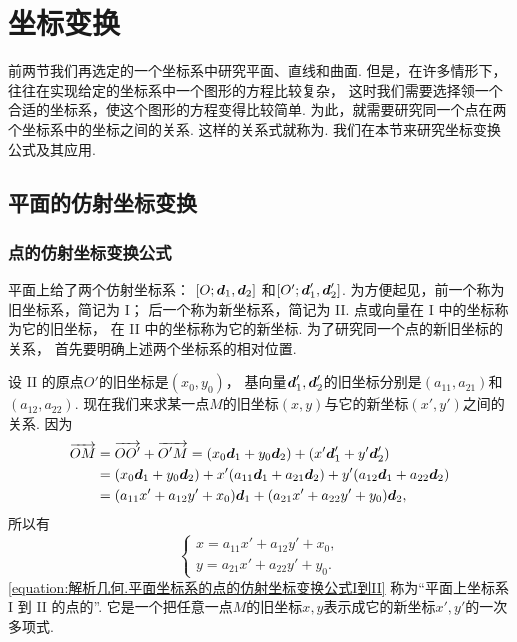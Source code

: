\section{坐标变换}
前两节我们再选定的一个坐标系中研究平面、直线和曲面.
但是，在许多情形下，往往在实现给定的坐标系中一个图形的方程比较复杂，
这时我们需要选择领一个合适的坐标系，使这个图形的方程变得比较简单.
为此，就需要研究同一个点在两个坐标系中的坐标之间的关系.
这样的关系式就称为.
我们在本节来研究坐标变换公式及其应用.

\subsection{平面的仿射坐标变换}
\subsubsection{点的仿射坐标变换公式}
平面上给了两个仿射坐标系：
\([O;\boldsymbol{d}_1,\boldsymbol{d}_2]\)
和\([O';\boldsymbol{d}_1',\boldsymbol{d}_2']\).
为方便起见，前一个称为旧坐标系，简记为 I；
后一个称为新坐标系，简记为 II.
点或向量在 I 中的坐标称为它的旧坐标，
在 II 中的坐标称为它的新坐标.
为了研究同一个点的新旧坐标的关系，
首先要明确上述两个坐标系的相对位置.

设 II 的原点\(O'\)的旧坐标是\((x_0,y_0)\)，
基向量\(\boldsymbol{d}_1',\boldsymbol{d}_2'\)的旧坐标分别是\((a_{11},a_{21})\)和\((a_{12},a_{22})\).
现在我们来求某一点\(M\)的旧坐标\((x,y)\)与它的新坐标\((x',y')\)之间的关系.
因为\begin{align*}
	\overrightarrow{OM}
	&= \overrightarrow{O O'} + \overrightarrow{O' M}
	= (x_0 \boldsymbol{d}_1 + y_0 \boldsymbol{d}_2)
	+ (x' \boldsymbol{d}_1' + y' \boldsymbol{d}_2') \\
	&= (x_0 \boldsymbol{d}_1 + y_0 \boldsymbol{d}_2)
	+ x' (a_{11} \boldsymbol{d}_1 + a_{21} \boldsymbol{d}_2)
	+ y' (a_{12} \boldsymbol{d}_1 + a_{22} \boldsymbol{d}_2) \\
	&= (a_{11} x' + a_{12} y' + x_0) \boldsymbol{d}_1
	+ (a_{21} x' + a_{22} y' + y_0) \boldsymbol{d}_2,
\end{align*}
所以有\begin{equation}\label{equation:解析几何.平面坐标系的点的仿射坐标变换公式I到II}
	\left\{ \begin{array}{l}
		x = a_{11} x' + a_{12} y' + x_0, \\
		y = a_{21} x' + a_{22} y' + y_0.
	\end{array} \right.
\end{equation}
\cref{equation:解析几何.平面坐标系的点的仿射坐标变换公式I到II}
称为“平面上坐标系 I 到 II 的点的”.
它是一个把任意一点\(M\)的旧坐标\(x,y\)表示成它的新坐标\(x',y'\)的一次多项式.


